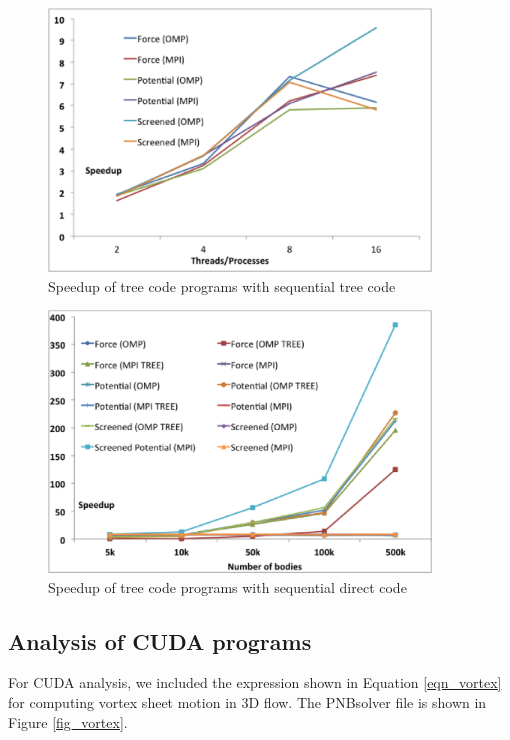 \documentclass[draftclsnofoot]{elsarticle}
\begin{document}
\begin{figure}[!t]
\centering
\includegraphics[width=4.0in]{ompmpi1.eps}
\caption{Speedup of tree code programs with sequential tree code}
\label{fig_ompmpi1}
\end{figure}

\begin{figure}[!t]
\centering
\includegraphics[width=4.0in]{ompmpi2.eps}
\caption{Speedup of tree code programs with sequential direct code}
\label{fig_ompmpi2}
\end{figure}

\subsection{Analysis of CUDA programs}
\label{sec_cuda}

For CUDA analysis, we included the expression  shown in Equation  \ref{eqn_vortex} \cite{vortex} for computing vortex sheet motion in 3D flow. The PNBsolver file
is shown in Figure \ref{fig_vortex}. 
\end{document}

